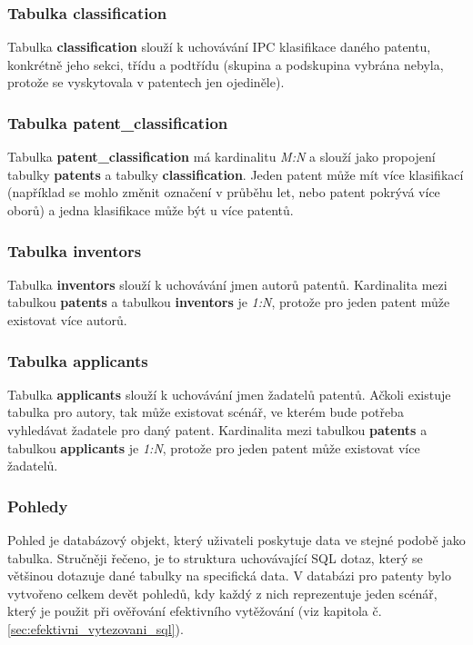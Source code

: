 \subsubsection{Tabulka classification}
Tabulka \textbf{classification} slouží k uchovávání \gls{IPC} klasifikace daného patentu, konkrétně jeho sekci, třídu a podtřídu (skupina a podskupina vybrána nebyla, protože se vyskytovala v patentech jen ojediněle). 

\subsubsection{Tabulka patent\_classification}
Tabulka \textbf{patent\_classification} má kardinalitu \textit{M:N} a slouží jako propojení tabulky \textbf{patents} a tabulky \textbf{classification}. Jeden patent může mít více klasifikací (například se mohlo změnit označení v průběhu let, nebo patent pokrývá více oborů) a jedna klasifikace může být u více patentů.

\subsubsection{Tabulka inventors}
Tabulka \textbf{inventors} slouží k uchovávání jmen autorů patentů. Kardinalita mezi tabulkou \textbf{patents} a tabulkou \textbf{inventors} je \textit{1:N}, protože pro jeden patent může existovat více autorů.

\subsubsection{Tabulka applicants}
Tabulka \textbf{applicants} slouží k uchovávání jmen žadatelů patentů. Ačkoli existuje tabulka pro autory, tak může existovat scénář, ve kterém bude potřeba vyhledávat žadatele pro daný patent. Kardinalita mezi tabulkou \textbf{patents} a tabulkou \textbf{applicants} je \textit{1:N}, protože pro jeden patent může existovat více žadatelů.

\subsubsection{Pohledy}
Pohled je databázový objekt, který uživateli poskytuje data ve stejné podobě jako tabulka. Stručněji řečeno, je to struktura uchovávající \gls{SQL} dotaz, který se většinou dotazuje dané tabulky na specifická data.
\newline
\indent V databázi pro patenty bylo vytvořeno celkem devět pohledů, kdy každý z nich reprezentuje jeden scénář, který je použit při ověřování efektivního vytěžování (viz kapitola č. \ref{sec:efektivni_vytezovani_sql}).

